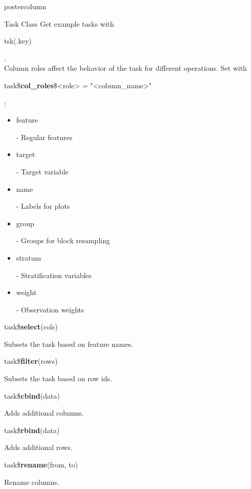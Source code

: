 \documentclass{beamer}
\newcommand{\codeinline}[1]{\begin{codeboxinline}#1\end{codeboxinline}}
\begin{document}
\begin{frame}[fragile]{}
\begin{columns}
\begin{column}{.245\textwidth}
\begin{beamercolorbox}[center]{postercolumn}
\begin{minipage}{.98\textwidth}
{\begin{myblock}{Task Class}
	                        Get example tasks with \codeinline{tsk(.key)}.
							\vspace{1em}
							\\
							Column roles affect the behavior of the task for different operations. Set with \codeinline{task\$\textbf{col\_roles}\$<role> = "<column\_name>"}:
							\\
							\begin{itemize}
								\item \codeinline{feature} - Regular features
								\item \codeinline{target} - Target variable
								\item \codeinline{name} - Labels for plots
								\item \codeinline{group} -  Groups for block resampling
								\item \codeinline{stratum} - Stratification variables
								\item \codeinline{weight} - Observation weights
							\end{itemize}
							\vspace{1em}
							\begin{codebox}
								task\$\textbf{select}(cols)
							\end{codebox}
							Subsets the task based on feature names.
							\\
							\begin{codebox}
								task\$\textbf{filter}(rows)
							\end{codebox}
							Subsets the task based on row ids.
							\\
							\begin{codebox}
								task\$\textbf{cbind}(data)
							\end{codebox}
							Adds additional columns.
							\\
							\begin{codebox}
								task\$\textbf{rbind}(data)
							\end{codebox}
							Adds additional rows.
							\\
							\begin{codebox}
								task\$\textbf{rename}(from, to)
							\end{codebox}
							Rename columns.
						\end{myblock}
					\vfill}
				\end{minipage}
			\end{beamercolorbox}
		\end{column}
		\begin{column}{.245\textwidth}

\end{column}
\end{columns}
\end{frame}
\end{document}
